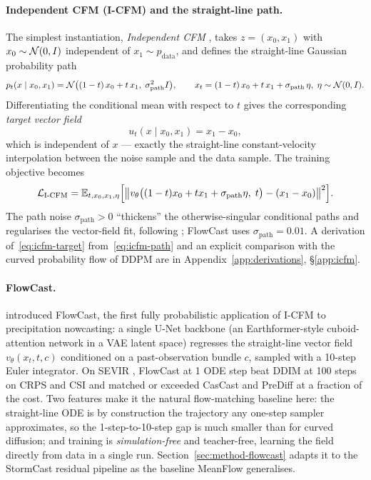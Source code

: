 \paragraph{Independent CFM (I-CFM) and the straight-line path.} The simplest instantiation, \emph{Independent CFM} \citep{tong2024improving}, takes $z = (x_0, x_1)$ with $x_0 \sim \mathcal{N}(0, I)$ independent of $x_1 \sim p_{\text{data}}$, and defines the straight-line Gaussian probability path
\begin{equation}
  p_t(x \mid x_0, x_1) = \mathcal{N}\bigl((1 - t)\,x_0 + t\,x_1,\; \sigma_{\text{path}}^2 I\bigr),
  \qquad
  x_t = (1 - t)\,x_0 + t\,x_1 + \sigma_{\text{path}}\,\eta,\;\eta \sim \mathcal{N}(0, I).
  \label{eq:icfm-path}
\end{equation}
Differentiating the conditional mean with respect to $t$ gives the corresponding \emph{target vector field}
\begin{equation}
  u_t(x \mid x_0, x_1) = x_1 - x_0,
  \label{eq:icfm-target}
\end{equation}
which is independent of $x$ --- exactly the straight-line constant-velocity interpolation between the noise sample and the data sample. The training objective becomes
\begin{equation}
  \mathcal{L}_{\text{I-CFM}} = \mathbb{E}_{t, x_0, x_1, \eta}\Bigl[\bigl\|v_\theta\bigl((1 - t) x_0 + t x_1 + \sigma_{\text{path}}\eta,\; t\bigr) - (x_1 - x_0)\bigr\|^2\Bigr].
  \label{eq:icfm-loss}
\end{equation}
The path noise $\sigma_{\text{path}} > 0$ ``thickens'' the otherwise-singular conditional paths and regularises the vector-field fit, following \citet{tong2024improving}; FlowCast uses $\sigma_{\text{path}} = 0.01$. A derivation of~\eqref{eq:icfm-target} from~\eqref{eq:icfm-path} and an explicit comparison with the curved probability flow of DDPM are in Appendix~\ref{app:derivations}, \S\ref{app:icfm}.

\paragraph{FlowCast.} \citet{ribeiro2025flowcast} introduced FlowCast, the first fully probabilistic application of I-CFM to precipitation nowcasting: a single U-Net backbone (an Earthformer-style cuboid-attention network \citep{gao2022earthformer} in a VAE latent space) regresses the straight-line vector field $v_\theta(x_t, t, c)$ conditioned on a past-observation bundle $c$, sampled with a 10-step Euler integrator. On SEVIR \citep{veillette2020sevir}, FlowCast at 1 ODE step beat DDIM \citep{song2021ddim} at 100 steps on CRPS and CSI and matched or exceeded CasCast \citep{gong2024cascast} and PreDiff \citep{gao2023prediff} at a fraction of the cost. Two features make it the natural flow-matching baseline here: the straight-line ODE is by construction the trajectory any one-step sampler approximates, so the 1-step-to-10-step gap is much smaller than for curved diffusion; and training is \emph{simulation-free} and teacher-free, learning the field directly from data in a single run. Section~\ref{sec:method-flowcast} adapts it to the StormCast residual pipeline as the baseline MeanFlow generalises.

